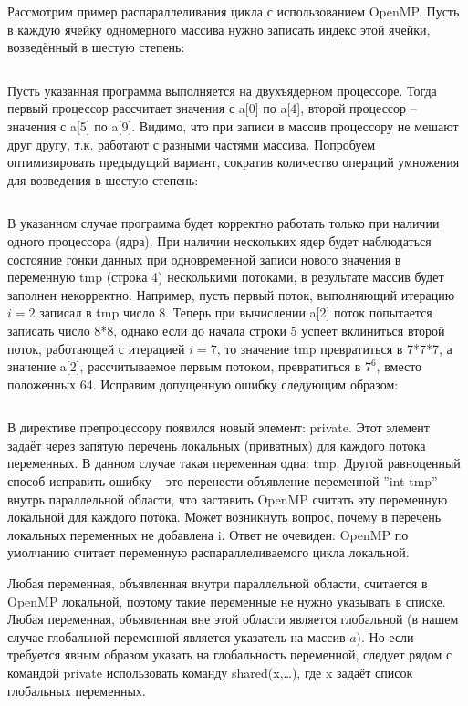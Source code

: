 Рассмотрим пример распараллеливания цикла с использованием \linebreak OpenMP. Пусть в каждую ячейку одномерного массива нужно записать индекс этой ячейки, возведённый в шестую степень:

\inputminted{c++}{listings/OpenMPExample5.cpp}

Пусть указанная программа выполняется на двухъядерном процессоре. Тогда первый процессор рассчитает значения с a[0] по a[4], второй процессор – значения с a[5] по a[9]. Видимо, что при записи в массив процессору не мешают друг другу, т.к. работают с разными частями массива. Попробуем оптимизировать предыдущий вариант, сократив количество операций умножения для возведения в шестую степень:

\inputminted{c++}{listings/OpenMPExample6.cpp}

В указанном случае программа будет корректно работать только при наличии одного процессора (ядра). При наличии нескольких ядер будет наблюдаться состояние гонки данных при одновременной записи нового значения в переменную tmp (строка 4) несколькими потоками, в результате массив будет заполнен некорректно. Например, пусть первый поток, выполняющий итерацию $i=2$ записал в tmp число 8. Теперь при вычислении a[2] поток попытается записать число 8*8, однако если до начала строки 5 успеет вклиниться второй поток, работающей с итерацией $i=7$, то значение tmp превратиться в 7*7*7, а значение a[2], рассчитываемое первым потоком, превратиться в $7^6$, вместо положенных 64. Исправим допущенную ошибку следующим образом:

\inputminted{c++}{listings/OpenMPExample7.cpp}

В директиве препроцессору появился новый элемент: private. Этот элемент задаёт через запятую перечень локальных (приватных) для каждого потока переменных. В данном случае такая переменная одна: tmp. Другой равноценный способ исправить ошибку – это перенести объявление переменной ''int tmp'' внутрь параллельной области, что заставить OpenMP считать эту переменную локальной для каждого потока. Может возникнуть вопрос, почему в перечень локальных переменных не добавлена i. Ответ не очевиден: OpenMP по умолчанию считает переменную распараллеливаемого цикла локальной.

Любая переменная, объявленная внутри параллельной области, считается в OpenMP локальной, поэтому такие переменные не нужно указывать в списке. Любая переменная, объявленная вне этой области является глобальной (в нашем случае глобальной переменной является указатель на массив $a$). Но если требуется явным образом указать на глобальность переменной, следует рядом с командой private использовать команду shared(x,\ldots), где x задаёт список глобальных переменных.

